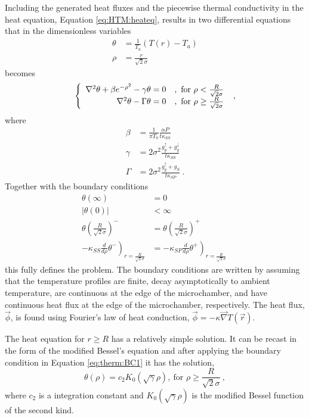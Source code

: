 Including the generated heat fluxes and the piecewise thermal conductivity in the heat equation, Equation \ref{eq:HTM:heateq}, results in two differential equations that in the dimensionless variables
\begin{align*}
	\theta&= \frac{1}{T_a} (T(r)-T_a) \\
	\rho&=\frac{r}{\sqrt{2} \sigma}
\end{align*}
becomes
\begin{equation}
	\left\{
	\begin{array}{r l}
	\nabla^2 \theta + \beta e^{-\rho^2} - \gamma \theta =0 & , \ \textrm{for } \rho < \frac{R}{\sqrt{2} \sigma} \\
	\nabla^2 \theta - \Gamma \theta =0 & , \ \textrm{for } \rho \geq \frac{R}{\sqrt{2} \sigma}
	\end{array}
	\right. \ , \label{eq:HTM:DE}
\end{equation}
where
\begin{align*}
	\beta &=\frac{1}{\pi T_0} \frac{\alpha P}{t \kappa_{SS}}\\
	\gamma&=2 \sigma^2 \frac{g_g^{\uparrow}+g_g^{\downarrow}}{t \kappa_{SS}} \\
	\Gamma&=2 \sigma^2 \frac{g_g^{\uparrow}+g_S             }{t \kappa_{SP}} \ .
\end{align*}
Together with the boundary conditions
\begin{align}
	\theta(\infty) &= 0 \label{eq:therm:BC1} \\
	|\theta(0)| &< \infty \label{eq:therm:BC2} \\
	\theta\left(\frac{R}{\sqrt{2} \sigma}\right)^- &= \theta\left(\frac{R}{\sqrt{2} \sigma}\right)^+ 
		\label{eq:therm:BC3} \\
	-\kappa_{SS} \left. \frac{d}{d\rho} \theta^- \right)_{r=\frac{R}{\sqrt{2} \sigma}}&=
	-\kappa_{SP} \left. \frac{d}{d\rho} \theta^+ \right)_{r=\frac{R}{\sqrt{2} \sigma}} \  \label{eq:therm:BC4}
\end{align}
this fully defines the problem.
The boundary conditions are written by assuming that the temperature profiles are finite, decay asymptotically to ambient temperature, are continuous at the edge of the microchamber, and have continuous heat flux at the edge of the microchamber, respectively.
The heat flux, $\vec{\phi}$, is found using Fourier's law of heat conduction, $\vec{\phi}=-\kappa \vec{\nabla} T(\vec{r})$.

The heat equation for $r \geq R$ has a relatively simple solution.
It can be recast in the form of the modified Bessel's equation and after applying the boundary condition in Equation \ref{eq:therm:BC1} it has the solution,
\begin{equation}
	\theta(\rho)=c_2 K_0 (\sqrt{\gamma} \rho) , \ \textrm{for } \rho \geq \frac{R}{\sqrt{2} \sigma} \ ,
\end{equation}
where $c_2$ is a integration constant and $K_0 (\sqrt{\gamma} \rho)$ is the modified Bessel function of the second kind.

